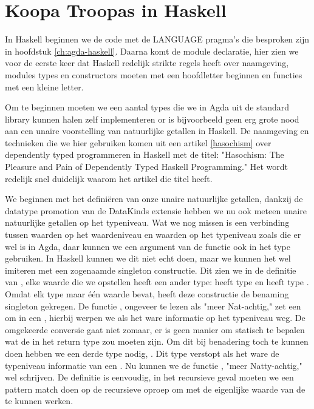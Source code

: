 \section{Koopa Troopas in Haskell}

In Haskell beginnen we de code met de LANGUAGE pragma's die besproken zijn in
hoofdstuk \ref{ch:agda-haskell}. Daarna komt de module declaratie, hier zien we
voor de eerste keer dat Haskell redelijk strikte regels heeft over naamgeving,
modules types en constructors moeten met een hoofdletter beginnen en functies
met een kleine letter.


Om te beginnen moeten we een aantal types die we in Agda uit de standard
library kunnen halen zelf implementeren or is bijvoorbeeld geen erg grote nood
aan een unaire voorstelling van natuurlijke getallen in Haskell. De naamgeving
en technieken die we hier gebruiken komen uit een artikel \ref{hasochism} over
dependently typed programmeren in Haskell met de titel: "Hasochism: The
Pleasure and Pain of Dependently Typed Haskell Programming." Het wordt redelijk
snel duidelijk waarom het artikel die titel heeft.


We beginnen met het definiëren van onze unaire natuurlijke getallen, dankzij de
datatype promotion van de DataKinds extensie hebben we nu ook meteen unaire
natuurlijke getallen op het typeniveau. Wat we nog missen is een verbinding
tussen waarden op het waardeniveau en waarden op het typeniveau zoals die er
wel is in Agda, daar kunnen we een argument van de functie ook in het type
gebruiken. In Haskell kunnen we dit niet echt doen, maar we kunnen het wel
imiteren met een zogenaamde singleton constructie. Dit zien we in de definitie
van , elke waarde die we opstellen heeft een ander type:
 heeft type  en  heeft type . Omdat elk type  maar één waarde bevat, heeft deze
constructie de benaming singleton gekregen. De functie , ongeveer
te lezen als "meer Nat-achtig," zet een  om in een ,
hierbij werpen we als het ware informatie op het typeniveau weg. De omgekeerde
conversie gaat niet zomaar, er is geen manier om statisch te bepalen wat de
 in het return type  zou moeten zijn. Om dit bij
benadering toch te kunnen doen hebben we een derde type nodig, .
Dit type verstopt als het ware de typeniveau informatie van een . Nu kunnen we de functie , "meer Natty-achtig," wel
schrijven. De definitie is eenvoudig, in het recursieve geval moeten we een
pattern match doen op de recursieve oproep om met de eigenlijke waarde van de
 te kunnen werken.

